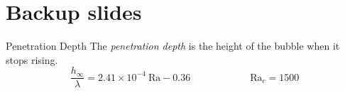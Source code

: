 \documentclass[12pt]{beamer}
\begin{document}
\appendix

\section*{Backup slides}

\begin{frame}[t]{Penetration Depth}
The \textit{penetration depth} is the height of the bubble when it stops rising.
\begin{equation*}
\frac{h_\infty}{\lambda} = 2.41 \times 10^{-4} ~ \text{Ra} - 0.36 \qquad \qquad \qquad \text{Ra}_c = 1500
\end{equation*}
\begin{center}
\vspace{-10pt}
\end{center}
\end{frame}
\end{document}
